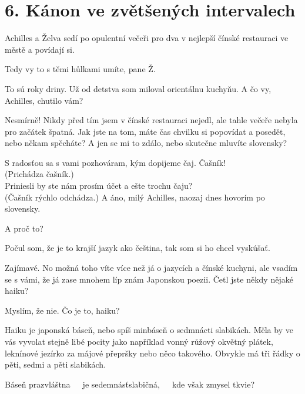 \documentclass[12pt]{article}
\begin{document}
\section*{6. Kánon ve zvětšených intervalech}
Achilles a Želva sedí po opulentní večeři pro dva v nejlepší čínské restauraci 
    ve městě a povídají si.
\begin{description}[itemsep=0pt]
\item[A:] Tedy vy to s těmi hůlkami umíte, pane Ž.

\item[Ž:] To sú roky driny. Už od detstva som miloval orientálnu kuchyňu. 
    A čo vy, Achilles, chutilo vám?

\item[A:] Nesmírně! Nikdy před tím jsem v čínské restauraci nejedl, ale
    tahle večeře nebyla pro začátek špatná. Jak jste na tom, máte čas chvilku
    si popovídat a posedět, nebo někam spěcháte? A jen se mi to zdálo, nebo skutečne mluvíte slovensky?

\item[Ž:] S radosťou sa s vami pozhováram, kým dopijeme čaj. Čašník!\\
    (Prichádza čašník.)\\
    Priniesli by ste nám prosím účet a ešte trochu čaju?\\
    (Čašník rýchlo odchádza.)
    A áno, milý Achilles, naozaj dnes hovorím po slovensky.
    
\item[A:] A proč to?

\item[Ž:] Počul som, že je to krajší jazyk ako čeština, tak som si ho chcel vyskúšať.

\item[A:] Zajímavé. No možná toho víte více než já o jazycích a čínské kuchyni, ale vsadím
    se s vámi, že já zase mnohem líp znám Japonskou poezii. Četl jste někdy
    nějaké haiku?

\item[Ž:] Myslím, že nie. Čo je to, haiku?

\item[A:] Haiku je japonská báseň, nebo spíš minbáseň o sedmnácti slabikách. 
    Měla by ve vás vyvolat stejně libé pocity jako například vonný růžový okvětný 
    plátek, leknínové jezírko za májové přepršky nebo něco takového. Obvykle má tři 
    řádky o pěti, sedmi a pěti slabikách.

\item[Ž:] Báseň prazvláštna\ \ \ je sedemnásťslabičná,\ \ \ kde však zmysel tkvie?


\end{description}
\end{document}
